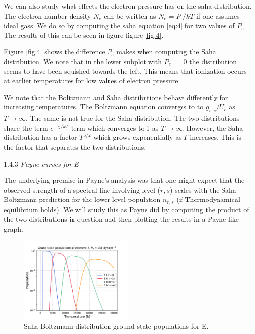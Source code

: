 \documentclass[a4paper,11.5pt,]{article}
\begin{document}
\begin{multicols}{2}
We can also study what effects the electron pressure has on the saha distribution. The electron number density $N_e$ can be written as $N_e = P_e/kT$ if one assumes ideal gass. We do so by computing the saha equation \eqref{eq:4} for two values of $P_e$. The results of this can be seen in figure figure \ref{fig:4}.

Figure \ref{fig:4} shows the difference $P_e$ makes when computing the Saha distribution. We note that in the lower subplot with $P_e = 10$ the distribution seems to have been squished towards the left. This means that ionization occurs at earlier temperatures for low values of electron pressure.


We note that the Boltzmann and Saha distributions behave differently for increasing temperatures. The Boltzmann equation converges to to $g_{r,s}/U_r$ as $T \rightarrow \infty$. The same is not true for the Saha distribution. The two distributions share the term $e^{-\chi /kT}$ term which converges to 1 as $T \rightarrow  \infty$. However, the Saha distribution has a factor $T^{3/2}$ which grows exponentially as $T$ increases. This is the factor that separates the two distributions.

\begin{center}
1.4.3\textit{ Payne curves for E}
\end{center}
The underlying premise in Payne's analysis was that one might expect that the observed strength of a spectral line involving level ($r,s$) scales with the Saha-Boltzmann prediction for the lower level population $n_{r,s}$ (if Thermodynamical equilibrium holds). We will study this as Payne did by computing the product of the two distributions in question and then plotting the results in a Payne-like graph. 

\begin{figure}[H]
	\centering
	\includegraphics[width=0.5\textwidth]{figures/payne_E.pdf}
	\caption{Saha-Boltzmann distribution ground state populations for E.}
	\label{fig:5}
\end{figure}


\end{multicols}
\end{document}
